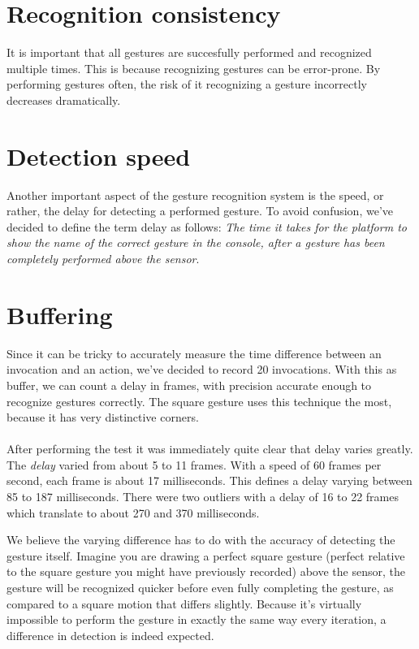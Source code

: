 \documentclass[a4paper]{article}
\begin{document}
  \section{Recognition consistency}
  It is important that all gestures are succesfully performed and recognized
  multiple times. This is because recognizing gestures can be error-prone. By
  performing gestures often, the risk of it recognizing a gesture incorrectly
  decreases dramatically.

  \section{Detection speed}
  Another important aspect of the gesture recognition system is the speed, or
  rather, the delay for detecting a performed gesture. To avoid confusion, we've
  decided to define the term delay as follows: \textit{The time it takes for the
    platform to show the name of the correct gesture in the console, after a
    gesture has been completely performed above the sensor}.

  \section{Buffering}
  Since it can be tricky to accurately measure the time difference between an
  invocation and an action, we've decided to record 20 invocations. With this as
  buffer, we can count a delay in frames, with precision accurate enough to
  recognize gestures correctly. The square gesture uses this technique the most,
  because it has very distinctive corners.

  \paragraph{}
  After performing the test it was immediately quite clear that delay varies
  greatly. The \emph{delay} varied from about 5 to 11 frames. With a speed of 60
  frames per second, each frame is about 17 milliseconds. This defines a delay
  varying between 85 to 187 milliseconds. There were two outliers with a delay
  of 16 to 22 frames which translate to about 270 and 370 milliseconds.

  We believe the varying difference has to do with the accuracy of detecting the gesture
  itself. Imagine you are drawing a perfect square gesture (perfect relative to
  the square gesture you might have previously recorded) above the sensor, the
  gesture will be recognized quicker before even fully completing the gesture,
  as compared to a square motion that differs slightly. Because it's virtually
  impossible to perform the gesture in exactly the same way every iteration, a
  difference in detection is indeed expected.
\end{document}
